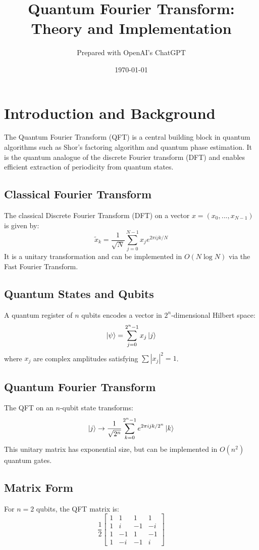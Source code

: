 \documentclass[12pt]{book}
\title{Quantum Fourier Transform: Theory and Implementation}
\author{Prepared with OpenAI's ChatGPT}
\date{\today}
\begin{document}
\maketitle
\tableofcontents

\chapter{Introduction and Background}
The Quantum Fourier Transform (QFT) is a central building block in quantum algorithms such as Shor's factoring algorithm and quantum phase estimation. It is the quantum analogue of the discrete Fourier transform (DFT) and enables efficient extraction of periodicity from quantum states.

\section{Classical Fourier Transform}
The classical Discrete Fourier Transform (DFT) on a vector $x = (x_0, ..., x_{N-1})$ is given by:
\[
\tilde{x}_k = \frac{1}{\sqrt{N}} \sum_{j=0}^{N-1} x_j e^{2\pi i jk / N}
\]
It is a unitary transformation and can be implemented in $O(N \log N)$ via the Fast Fourier Transform.

\section{Quantum States and Qubits}
A quantum register of $n$ qubits encodes a vector in $2^n$-dimensional Hilbert space:
\[
\ket{\psi} = \sum_{j=0}^{2^n - 1} x_j \ket{j}
\]
where $x_j$ are complex amplitudes satisfying $\sum |x_j|^2 = 1$.

\section{Quantum Fourier Transform}
The QFT on an $n$-qubit state transforms:
\[
\ket{j} \rightarrow \frac{1}{\sqrt{2^n}} \sum_{k=0}^{2^n - 1} e^{2\pi i jk / 2^n} \ket{k}
\]
This unitary matrix has exponential size, but can be implemented in $O(n^2)$ quantum gates.

\section{Matrix Form}
For $n = 2$ qubits, the QFT matrix is:
\[
\frac{1}{2}
\begin{bmatrix}
1 & 1 & 1 & 1 \\
1 & i & -1 & -i \\
1 & -1 & 1 & -1 \\
1 & -i & -1 & i
\end{bmatrix}
\]
\end{document}
